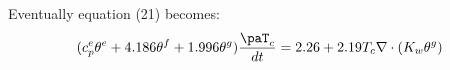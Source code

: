 Eventually equation (21) becomes:
\begin{equation}
(c_p^e \theta^e + 4.186 \theta^f + 1.996 \theta^g) \frac{\paT_c}{dt} = 2.26 + 2.19 T_c \nabla \cdot ( K_w  \theta^g)
\end{equation}